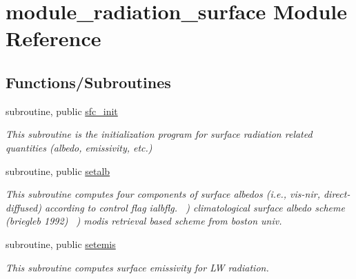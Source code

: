 \hypertarget{namespacemodule__radiation__surface}{}\section{module\+\_\+radiation\+\_\+surface Module Reference}
\label{namespacemodule__radiation__surface}
\subsection*{Functions/\+Subroutines}
\begin{DoxyCompactItemize}
\item 
subroutine, public \hyperlink{group__module__radiation__surface_gaeb08607a27653edcaca756366feff0c0}{sfc\+\_\+init}
\begin{DoxyCompactList}\small\item\em This subroutine is the initialization program for surface radiation related quantities (albedo, emissivity, etc.) \end{DoxyCompactList}\end{DoxyCompactItemize}
{\bf }\par
\begin{DoxyCompactItemize}
\item 
subroutine, public \hyperlink{group__module__radiation__surface_ga0db1853de27009e91e016ca940839001}{setalb}
\begin{DoxyCompactList}\small\item\em This subroutine computes four components of surface albedos (i.\+e., vis-\/nir, direct-\/diffused) according to control flag ialbflg. ~) climatological surface albedo scheme (briegleb 1992) ~) modis retrieval based scheme from boston univ. \end{DoxyCompactList}\end{DoxyCompactItemize}

{\bf }\par
\begin{DoxyCompactItemize}
\item 
subroutine, public \hyperlink{group__module__radiation__surface_gae6b9cfae267270c6b338e5edafdd2456}{setemis}
\begin{DoxyCompactList}\small\item\em This subroutine computes surface emissivity for LW radiation. \end{DoxyCompactList}\end{DoxyCompactItemize}

